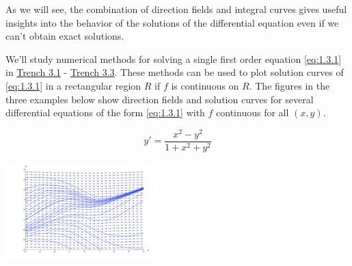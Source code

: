 \documentclass{ximera}
\begin{document}
 
As we will  see, the combination of  direction fields and
 integral curves gives  useful insights into the behavior of
the solutions of the differential equation even if
we can't obtain exact solutions.
 
We'll study numerical methods for solving a single first order
equation \eqref{eq:1.3.1} in \href{https://ximera.osu.edu/ode/main/eulersMethod/eulersMethod}{Trench 3.1} - \href{https://ximera.osu.edu/ode/main/rungeKutta/rungeKutta}{Trench 3.3}. These methods can be
used
to plot solution curves of \eqref{eq:1.3.1} in a rectangular region $R$ if $f$ is continuous on $R$. The figures in the three examples below show direction fields and solution
curves for several differential equations of the form \eqref{eq:1.3.1} with $f$
 continuous for all $(x,y)$.
 \begin{example}\label{ex:fig010302}
$$
 y'=\frac{x^2-y^2}{1+x^2+y^2}
 $$
\begin{image}
  \includegraphics[height=1.5in]{fig010302.jpg}
\end{image}
\end{example}
 
\end{document}
